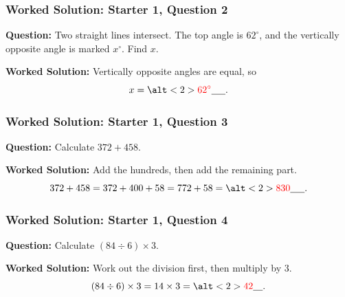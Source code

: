 \documentclass[aspectratio=169]{beamer}
\newcommand{\ablank}[1]{%
  \alt<2>{\textcolor{red}{#1}}{\underline{\phantom{#1}}}%
}
\begin{document}
\begin{frame}
  \frametitle{Worked Solution: Starter 1, Question 2}

  \textbf{Question:} Two straight lines intersect. The top angle is \(62^\circ\), and the vertically opposite angle is marked \(x^\circ\). Find \(x\).

  \begin{center}
  \end{center}

  \textbf{Worked Solution:} Vertically opposite angles are equal, so
  \[
  x = \ablank{62^\circ}.
  \]
\end{frame}

\begin{frame}
  \frametitle{Worked Solution: Starter 1, Question 3}

  \textbf{Question:} Calculate \(372 + 458\).

  \textbf{Worked Solution:} Add the hundreds, then add the remaining part.
  \[
  372 + 458 = 372 + 400 + 58 = 772 + 58 = \ablank{830}.
  \]
\end{frame}

\begin{frame}
  \frametitle{Worked Solution: Starter 1, Question 4}

  \textbf{Question:} Calculate \((84 \div 6) \times 3\).

  \textbf{Worked Solution:} Work out the division first, then multiply by \(3\).
  \[
  (84 \div 6) \times 3 = 14 \times 3 = \ablank{42}.
  \]
\end{frame}
\end{document}
